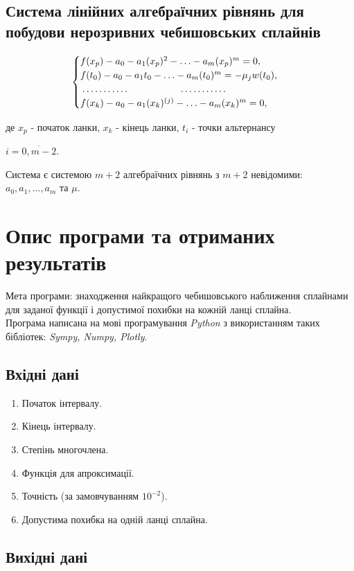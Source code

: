 \documentclass[ukrainian,14pt]{extarticle}
\begin{document}
\newpage

\subsection{Система лінійних алгебраїчних рівнянь для побудови нерозривних чебишовських сплайнів}

$$
\begin{cases}
f(x_p) - a_0 - a_1 (x_p)^{2} - \ldots - a_m(x_p)^m=0, \\
f(t_0)-a_0-a_1t_0 - \ldots - a_m(t_0)^m = - \mu_jw(t_0),\\
\dotfill\hfill\hbox{} \dotfill\hfill\hbox{}\\
f(x_k) -a_0 -a_1 (x_k)^{(j)} - \ldots - a_m(x_k)^m = 0,
\end{cases}
$$

де $x_p$ - початок ланки, $x_k$ - кінець ланки, $t_i$ - точки альтернансу

$i = \overline{0, m-2}$.

Система є системою $m+2$ алгебраїчних рівнянь з $m+2$ невідомими: $a_0, a_1, \ldots ,a_m$ та $\mu$.

\newpage
\section{Опис програми та отриманих результатів}
Мета програми: знаходження найкращого чебишовського наближення сплайнами для заданої функції і допустимої похибки на кожній ланці сплайна. \\
Програма написана на мові програмування \emph{Python} з використанням таких бібліотек: \emph{Sympy, Numpy, Plotly}.
\subsection{Вхідні дані}

\begin{enumerate}
\item Початок інтервалу.
\item Кінець інтервалу.
\item Степінь многочлена.
\item Функція для апроксимації.
\item Точність (за замовчуванням $10^{-2}$).
\item Допустима похибка на одній ланці сплайна.
\end{enumerate}

\subsection{Вихідні дані}
\end{document}
